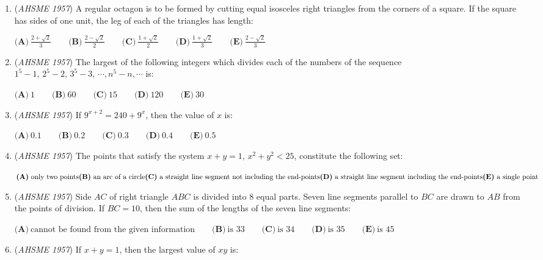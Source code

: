 \begin{enumerate}
	\item (\textit{AHSME 1957}) A regular octagon is to be formed by cutting equal isosceles right triangles from the corners of a square. 
If the square has sides of one unit, the leg of each of the triangles has length: 


 $\textbf{(A)}\ \frac{2 + \sqrt{2}}{3} \qquad \textbf{(B)}\ \frac{2 - \sqrt{2}}{2}\qquad \textbf{(C)}\ \frac{1+\sqrt{2}}{2}\qquad\textbf{(D)}\ \frac{1+\sqrt{2}}{3}\qquad\textbf{(E)}\ \frac{2-\sqrt{2}}{3}$


	\item (\textit{AHSME 1957}) The largest of the following integers which divides each of the numbers of the sequence $1^5 - 1,\, 2^5 - 2,\, 3^5 - 3,\, \cdots, n^5 - n, \cdots$ is: 


 $\textbf{(A)}\ 1 \qquad \textbf{(B)}\ 60 \qquad \textbf{(C)}\ 15 \qquad \textbf{(D)}\ 120\qquad \textbf{(E)}\ 30$


	\item (\textit{AHSME 1957}) If $9^{x + 2} = 240 + 9^x$, then the value of $x$ is: 


 $\textbf{(A)}\ 0.1 \qquad \textbf{(B)}\ 0.2\qquad \textbf{(C)}\ 0.3\qquad \textbf{(D)}\ 0.4\qquad \textbf{(E)}\ 0.5$


	\item (\textit{AHSME 1957}) The points that satisfy the system $x + y = 1,\, x^2 + y^2 < 25$, constitute the following set: 


 $\textbf{(A)}\ \text{only two points} \qquad \\  \textbf{(B)}\ \text{an arc of a circle}\qquad \\  \textbf{(C)}\ \text{a straight line segment not including the end-points}\qquad\\  \textbf{(D)}\ \text{a straight line segment including the end-points}\qquad\\  \textbf{(E)}\ \text{a single point}$


	\item (\textit{AHSME 1957}) Side $AC$ of right triangle $ABC$ is divided into $8$ equal parts. Seven line segments parallel to $BC$ are drawn to $AB$ from the points of division. 
If $BC = 10$, then the sum of the lengths of the seven line segments: 


 $\textbf{(A)}\ \text{cannot be found from the given information} \qquad \textbf{(B)}\ \text{is }{33}\qquad \textbf{(C)}\ \text{is }{34}\qquad\textbf{(D)}\ \text{is }{35}\qquad\textbf{(E)}\ \text{is }{45}$


	\item (\textit{AHSME 1957}) If $x + y = 1$, then the largest value of $xy$ is: 



\end{enumerate}
